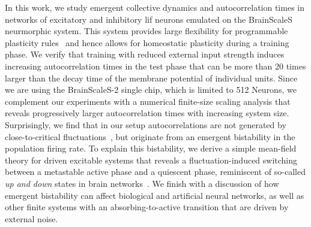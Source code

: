 In this work, we study emergent collective dynamics and autocorrelation times in networks of excitatory and inhibitory \gls{lif} neurons emulated on the BrainScaleS neurmorphic system.
This system provides large flexibility for programmable plasticity rules~\cite{pehle_brainscales-2_2022} and hence allows for homeostatic plasticity during a training phase.
We verify that training with reduced external input strength induces increasing autocorrelation times in the test phase that can be more than 20 times larger than the decay time of the membrane potential of individual units.
Since we are using the BrainScaleS-2 single chip, which is limited to 512 Neurons, we complement our experiments with a numerical finite-size scaling analysis that reveals progressively larger autocorrelation times with increasing system size.
Surprisingly, we find that in our setup autocorrelations are not generated by close-to-critical fluctuations~\cite{zierenberg_homeostatic_2018}, but originate from an emergent bistability in the population firing rate.
To explain this bistability, we derive a simple mean-field theory for driven excitable systems that reveals a fluctuation-induced switching between a metastable active phase and a quiescent phase, reminiscent of so-called \emph{up and down} states in brain networks~\cite{wilson_up_2008,stern_spontaneous_1997,cossart_attractor_2003,hidalgo_stochastic_2012}.
We finish with a discussion of how emergent bistability can affect biological and artificial neural networks, as well as other finite systems with an absorbing-to-active transition that are driven by external noise.






